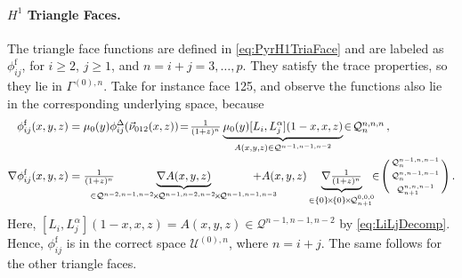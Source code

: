 \paragraph{\texorpdfstring{$H^1$}{H1} Triangle Faces.} 
The triangle face functions are defined in \eqref{eq:PyrH1TriaFace} and are labeled as $\phi_{ij}^\mathrm{f}$, for $i\geq2$, $j\geq1$, and $n=i+j=3,\ldots,p$.
They satisfy the trace properties, so they lie in $\Gamma^{(0),n}$.
Take for instance face 125, and observe the functions also lie in the corresponding underlying space, because
\begin{equation}
\begin{aligned}
	\phi_{ij}^\mathrm{f}(x,y,z)&=\mu_0(y)\phi_{ij}^\Tri(\vec{\nu}_{012}(x,z))
			\!=\!\textstyle{\frac{1}{(1+z)^n}}
				\underbrace{\mu_0(y)[L_i,L_j^\alpha](1-x,x,z)}_{A(x,y,z)\in\mathcal{Q}^{n-1,n-1,n-2}}\!\in\!\mathcal{Q}_n^{n,n,n}\,,\\
	\nabla\phi_{ij}^\mathrm{f}(x,y,z)&=\textstyle{\frac{1}{(1+z)^n}}\!\!\!\!\!\!\!\!\!\!\!\!\!\!
		\underbrace{\nabla A(x,y,z)}_{\in\mathcal{Q}^{n-2,n-1,n-2}\!\times\!\mathcal{Q}^{n-1,n-2,n-2}
			\!\times\!\mathcal{Q}^{n-1,n-1,n-3}}\!\!\!\!\!\!\!\!\!\!\!\!\!\!
				+A(x,y,z)\underbrace{\nabla\textstyle{\frac{1}{(1+z)^n}}}_{\in\{0\}\!\times\!\{0\}\!\times\!\mathcal{Q}_{n+1}^{0,0,0}}
			\!\!\!\in\!\Bigg(\begin{smallmatrix}\mathcal{Q}_n^{n-1,n,n-1}\\[2pt]\mathcal{Q}_n^{n,n-1,n-1}\\[2pt]
				\mathcal{Q}_{n+1}^{n,n,n-1}\end{smallmatrix}\Bigg)\,.
\end{aligned}
\end{equation}
Here, $[L_i,L_j^\alpha](1-x,x,z)=A(x,y,z)\in\mathcal{Q}^{n-1,n-1,n-2}$ by \eqref{eq:LiLjDecomp}.
Hence, $\phi_{ij}^\mathrm{f}$ is in the correct space $\mathcal{U}^{(0),n}$, where $n=i+j$.
The same follows for the other triangle faces.

